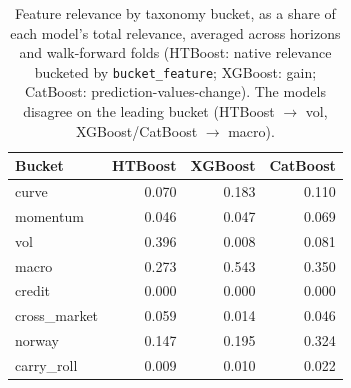\begin{table}[htbp]
\centering
\caption{Feature relevance by taxonomy bucket, as a share of each model's total relevance, averaged across horizons and walk-forward folds (HTBoost: native relevance bucketed by \texttt{bucket\_feature}; XGBoost: gain; CatBoost: prediction-values-change). The models disagree on the leading bucket (HTBoost $\to$ vol, XGBoost/CatBoost $\to$ macro).}
\label{tab:is_relevance}
\begin{tabular}{lrrr}
\toprule
Bucket & HTBoost & XGBoost & CatBoost \\
\midrule
curve & 0.070 & 0.183 & 0.110 \\
momentum & 0.046 & 0.047 & 0.069 \\
vol & 0.396 & 0.008 & 0.081 \\
macro & 0.273 & 0.543 & 0.350 \\
credit & 0.000 & 0.000 & 0.000 \\
cross\_market & 0.059 & 0.014 & 0.046 \\
norway & 0.147 & 0.195 & 0.324 \\
carry\_roll & 0.009 & 0.010 & 0.022 \\
\bottomrule
\end{tabular}
\end{table}
